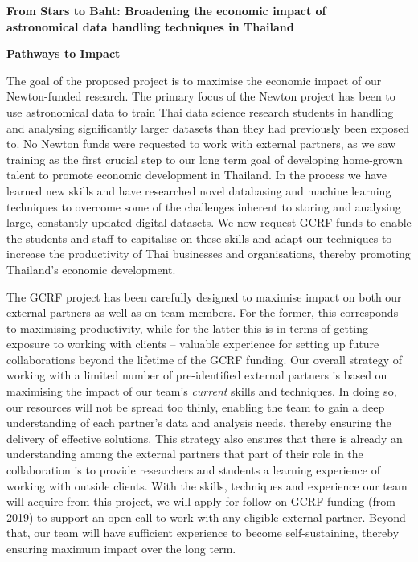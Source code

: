 \documentclass[11pt]{article}
\begin{document}
  \setcounter{figure}{0}
  \noindent
  {\LARGE \bf From Stars to Baht: Broadening the economic impact of \\
  astronomical data handling techniques in Thailand}
  
  \vspace{3mm}
  \noindent
  {\LARGE \bf Pathways to Impact}
  
  \vspace{3mm}
  \noindent
  The goal of the proposed project is to maximise the economic impact of our Newton-funded research. The primary focus of the Newton project has been to use astronomical data to train Thai data science research students in handling and analysing significantly larger datasets than they had previously been exposed to. No Newton funds were requested to work with external partners, as we saw training as the first crucial step to our long term goal of developing home-grown talent to promote economic development in Thailand. In the process we have learned new skills and have researched novel databasing and machine learning techniques to overcome some of the challenges inherent to storing and analysing large, constantly-updated digital datasets. We now request GCRF funds to enable the students and staff to capitalise on these skills and adapt our techniques to increase the productivity of Thai businesses and organisations, thereby promoting Thailand's economic development.  
  
  \vspace{2mm}
  \noindent
  The GCRF project has been carefully designed to maximise impact on both our external partners as well as on team members. For the former, this corresponds to maximising productivity, while for the latter this is in terms of getting exposure to working with clients -- valuable experience for setting up future collaborations beyond the lifetime of the GCRF funding. Our overall strategy of working with a limited number of pre-identified external partners is based on maximising the impact of our team's {\it current} skills and techniques. In doing so, our resources will not be spread too thinly, enabling the team to gain a deep understanding of each partner's data and analysis needs, thereby ensuring the delivery of effective solutions. This strategy also ensures that there is already an understanding among the external partners that part of their role in the collaboration is to provide researchers and students a learning experience of working with outside clients. With the skills, techniques and experience our team will acquire from this project, we will apply for follow-on GCRF funding (from 2019) to support an open call to work with any eligible external partner. Beyond that, our team will have sufficient experience to become self-sustaining, thereby ensuring maximum impact over the long term.
  
\end{document}
